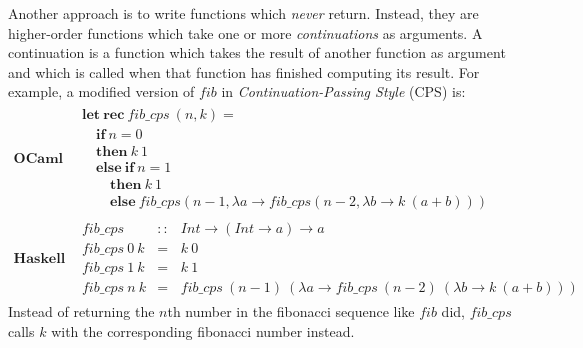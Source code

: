 \documentclass[10pt,a4paper]{exam} %
\begin{document}
\begin{questions}
    Another approach is to write functions which \emph{never} return. Instead, they are higher-order functions which take one or more \emph{continuations} as arguments. A continuation is a function which takes the result of another function as argument and which is called when that function has finished computing its result. For example, a modified version of $\mathit{fib}$ in \emph{Continuation-Passing Style} (CPS) is:
    \begin{displaymath}
    \begin{array}{l|l}
    \textbf{OCaml} & \begin{array}{l}
    \mathbf{let}~\mathbf{rec}~\mathit{fib\_cps}~(n,k) = \\
    \quad \mathbf{if}~n=0 \\
    \quad \mathbf{then}~k~1 \\
    \quad \mathbf{else}~\mathbf{if}~n=1 \\
    \qquad \mathbf{then}~k~1 \\
    \qquad \mathbf{else}~\mathit{fib}\_cps(n-1, \lambda a \to \mathit{fib\_cps}(n-2, \lambda b \to k~(a+b))) 
    \end{array} \\ \hline 
    \textbf{Haskell} & \begin{array}{lcl}
    \mathit{fib\_cps} & :: & \mathit{Int} \to (\mathit{Int} \to a) \to a \\
    \mathit{fib\_cps}~0~k & = & k~0 \\
    \mathit{fib\_cps}~1~k & = & k~1 \\
    \mathit{fib\_cps}~n~k & = & \mathit{fib\_cps}~(n-1)~(\lambda a \to \mathit{fib\_cps}~(n-2)~(\lambda b \to k~(a+b))) 
    \end{array}
    \end{array}
    \end{displaymath}
    Instead of returning the $n$th number in the fibonacci sequence like $\mathit{fib}$ did, $\mathit{fib\_cps}$ calls $k$ with the corresponding fibonacci number instead. 
    \begin{parts}
        

\end{parts}
\end{questions}
\end{document}
